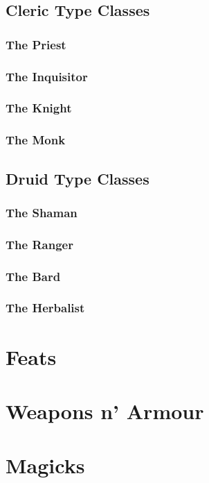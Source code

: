 \documentclass[openany,11pt,a4paper]{book}
\begin{document}
\section{Cleric Type Classes}
\subsection{The Priest}
\subsection{The Inquisitor}
\subsection{The Knight}
\subsection{The Monk}
\section{Druid Type Classes}
\subsection{The Shaman}
\subsection{The Ranger}
\subsection{The Bard}
\subsection{The Herbalist}
\chapter{Feats}
\chapter{Weapons n' Armour}
\chapter{Magicks}
\end{document}
